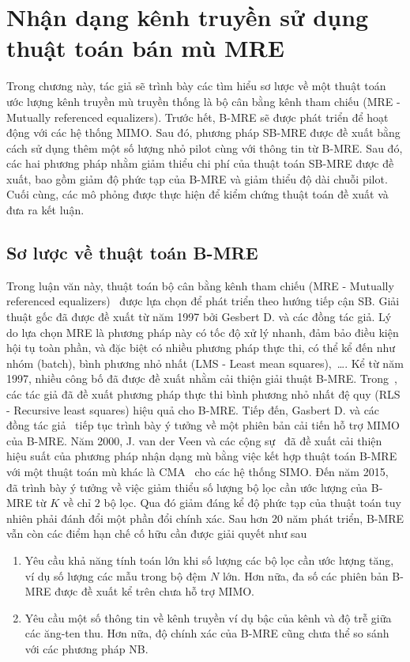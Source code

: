 \clearpage
{}

\setcounter{chapter}{1}
\chapter[{NHẬN DẠNG KÊNH TRUYỀN SỬ DỤNG THUẬT TOÁN BÁN MÙ MRE}]{Nhận dạng kênh truyền sử dụng thuật toán bán mù MRE}
\label{sec:MRE}

Trong chương này, tác giả sẽ trình bày các tìm hiểu sơ lược về một thuật toán ước lượng kênh truyền mù truyền thống là bộ cân bằng kênh tham chiếu (MRE - Mutually referenced equalizers). Trước hết, B-MRE sẽ được phát triển để hoạt động với các hệ thống MIMO. Sau đó, phương pháp SB-MRE được đề xuất bằng cách sử dụng thêm một số lượng nhỏ pilot cùng với thông tin từ B-MRE. Sau đó, các hai phương pháp nhằm giảm thiểu chi phí của thuật toán SB-MRE được đề xuất, bao gồm giảm độ phức tạp của B-MRE và giảm thiểu độ dài chuỗi pilot. Cuối cùng, các mô phỏng được thực hiện để kiểm chứng thuật toán đề xuất và đưa ra kết luận.

\section{Sơ lược về thuật toán B-MRE}

Trong luận văn này, thuật toán bộ cân bằng kênh tham chiếu (MRE - Mutually referenced equalizers)~\cite{original} được lựa chọn để phát triển theo hướng tiếp cận SB. Giải thuật gốc đã được đề xuất từ năm 1997 bởi Gesbert D. và các đồng tác giả. Lý do lựa chọn MRE là phương pháp này có tốc độ xử lý nhanh, đảm bảo điều kiện hội tụ toàn phần, và đặc biệt có nhiều phương pháp thực thi, có thể kể đến như nhóm (batch), bình phương nhỏ nhất (LMS - Least mean squares),~\ldots. Kể từ năm 1997, nhiều công bố đã được đề xuất nhằm cải thiện giải thuật B-MRE. Trong~\cite{GesbertSPAWC}, các tác giả đã đề xuất phương pháp thực thi bình phương nhỏ nhất đệ quy (RLS - Recursive least squares) hiệu quả cho B-MRE. Tiếp đến, Gasbert D. và các đồng tác giả~\cite{Gesbert1997} tiếp tục trình bày ý tưởng về một phiên bản cải tiến hỗ trợ MIMO của B-MRE. Năm 2000, J. van der Veen và các cộng sự~\cite{Veen2000} đã đề xuất cải thiện hiệu suất của phương pháp nhận dạng mù bằng việc kết hợp thuật toán B-MRE với một thuật toán mù khác là CMA~\cite{Treichler1983} cho các hệ thống SIMO. Đến năm 2015,~\cite{Yu2015} đã trình bày ý tưởng về việc giảm thiểu số lượng bộ lọc cần ước lượng của B-MRE từ $K$ về chỉ $2$ bộ lọc. Qua đó giảm đáng kể độ phức tạp của thuật toán tuy nhiên phải đánh đổi một phần đổi chính xác. Sau hơn 20 năm phát triển, B-MRE vẫn còn các điểm hạn chế cố hữu cần được giải quyết như sau
\begin{enumerate}
    \item Yêu cầu khả năng tính toán lớn khi số lượng các bộ lọc cần ước lượng tăng, ví dụ số lượng các mẫu trong bộ đệm $N$ lớn. Hơn nữa, đa số các phiên bản B-MRE được đề xuất kể trên chưa hỗ trợ MIMO.
    \item Yêu cầu một số thông tin về kênh truyền ví dụ bậc của kênh và độ trễ giữa các ăng-ten thu. Hơn nữa, độ chính xác của B-MRE cũng chưa thể so sánh với các phương pháp NB.
\end{enumerate}

